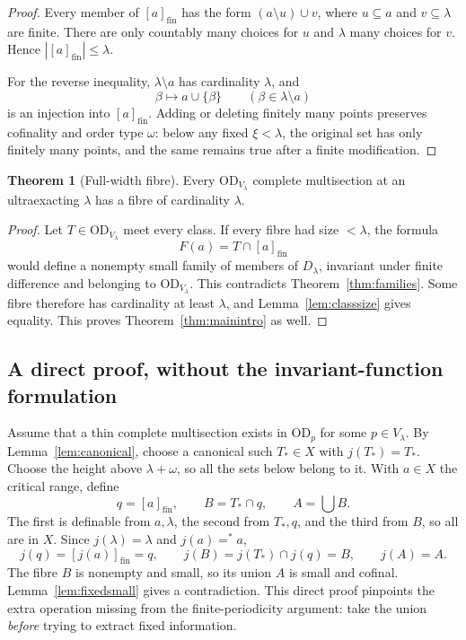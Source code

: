 \documentclass[11pt,letterpaper]{article}
\theoremstyle{definition}
\newtheorem{theorem}[definition]{Theorem}
\numberwithin{equation}{section}
\newcommand{\OD}{\mathrm{OD}}
\newcommand{\eqfin}{\mathrel{=^{*}}}
\newcommand{\cl}[1]{[#1]_{\mathrm{fin}}}
\begin{document}
\begin{proof}
Every member of $\cl a$ has the form
$(a\setminus u)\cup v$, where $u\subseteq a$ and $v\subseteq\lambda$ are finite. There are only countably many choices for $u$ and $\lambda$ many choices for $v$. Hence $|\cl a|\le\lambda$.

For the reverse inequality, $\lambda\setminus a$ has cardinality $\lambda$, and
\[
 \beta\longmapsto a\cup\{\beta\}
 \qquad(\beta\in\lambda\setminus a)
\]
is an injection into $\cl a$. Adding or deleting finitely many points preserves cofinality and order type $\omega$: below any fixed $\xi<\lambda$, the original set has only finitely many points, and the same remains true after a finite modification.
\end{proof}

\begin{theorem}[Full-width fibre]\label{thm:multisection}
Every $\OD_{V_\lambda}$ complete multisection at an ultraexacting $\lambda$ has a fibre of cardinality $\lambda$.
\end{theorem}

\begin{proof}
Let $T\in\OD_{V_\lambda}$ meet every class. If every fibre had size $<\lambda$, the formula
\[
 F(a)=T\cap\cl a
\]
would define a nonempty small family of members of $D_\lambda$, invariant under finite difference and belonging to $\OD_{V_\lambda}$. This contradicts Theorem~\ref{thm:families}. Some fibre therefore has cardinality at least $\lambda$, and Lemma~\ref{lem:classsize} gives equality. This proves Theorem~\ref{thm:mainintro} as well.
\end{proof}

\subsection{A direct proof, without the invariant-function formulation}

Assume that a thin complete multisection exists in $\OD_p$ for some $p\in V_\lambda$. By Lemma~\ref{lem:canonical}, choose a canonical such $T_*\in X$ with $j(T_*)=T_*$. Choose the height above $\lambda+\omega$, so all the sets below belong to it. With $a\in X$ the critical range, define
\[
 q=\cl a,\qquad B=T_*\cap q,\qquad A=\bigcup B.
\]
The first is definable from $a,\lambda$, the second from $T_*,q$, and the third from $B$, so all are in $X$. Since $j(\lambda)=\lambda$ and $j(a)\eqfin a$,
\[
 j(q)=\cl{j(a)}=q,
 \qquad j(B)=j(T_*)\cap j(q)=B,
 \qquad j(A)=A.
\]
The fibre $B$ is nonempty and small, so its union $A$ is small and cofinal. Lemma~\ref{lem:fixedsmall} gives a contradiction. This direct proof pinpoints the extra operation missing from the finite-periodicity argument: take the union \emph{before} trying to extract fixed information.
\end{document}
